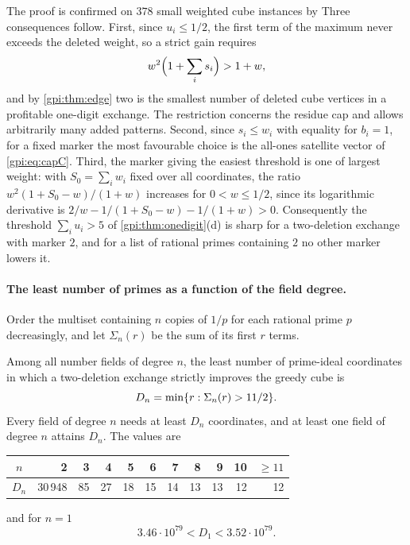 The proof is confirmed on $378$ small weighted cube instances by
Three consequences
follow. First, since $u_i\le1/2$, the first term of the maximum never exceeds the deleted
weight, so a strict gain requires
\begin{equation}\label{gpi:eq:edge-threshold}
 w^2\Bigl(1+\sum_is_i\Bigr)>1+w ,
\end{equation}
and by \cref{gpi:thm:edge} two is the smallest number of deleted cube vertices in a profitable
one-digit exchange. The restriction concerns the residue cap and allows arbitrarily many
added patterns. Second, since $s_i\le w_i$ with equality for $b_i=1$, for a fixed marker the
most favourable choice is the all-ones satellite vector of \eqref{gpi:eq:capC}. Third, the
marker giving the easiest threshold is one of largest weight: with $S_0=\sum_iw_i$ fixed over
all coordinates, the ratio $w^2(1+S_0-w)/(1+w)$ increases for $0<w\le1/2$, since its
logarithmic derivative is $2/w-1/(1+S_0-w)-1/(1+w)>0$. Consequently the threshold
$\sum_iu_i>5$ of \cref{gpi:thm:onedigit}(d) is sharp for a two-deletion exchange with marker
$2$, and for a list of rational primes containing $2$ no other marker lowers it.

\paragraph{The least number of primes as a function of the field degree.}
Order the multiset containing $n$ copies of $1/p$ for each rational prime $p$ decreasingly,
and let $\Sigma_n(r)$ be the sum of its first $r$ terms.

\begin{proposition}\label{gpi:prop:thresholds}
Among all number fields of degree $n$, the least number of prime-ideal coordinates in which
a two-deletion exchange strictly improves the greedy cube is
\[
 D_n=\min\{r:\Sigma_n(r)>11/2\}.
\]
Every field of degree $n$ needs at least $D_n$ coordinates, and at least one field of degree
$n$ attains $D_n$. The values are
\begin{center}
\begin{tabular}{c|rrrrrrrrrr}
$n$&2&3&4&5&6&7&8&9&10&$\ge11$\\ \hline
$D_n$&30\,948&85&27&18&15&14&13&13&12&12
\end{tabular}
\end{center}
and for $n=1$
\[
 3.46\cdot10^{79}<D_1<3.52\cdot10^{79}.
\]
\end{proposition}

